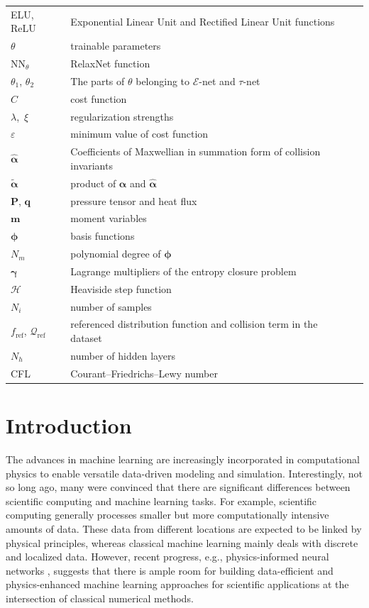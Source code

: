 \documentclass[preprint,3p,12pt,sort&compress]{elsarticle}
\begin{document}
\begin{table}
\begin{tabular*}{16cm}{lll}
		ELU, ReLU & Exponential Linear Unit and Rectified Linear Unit functions \\
		$\theta$ & trainable parameters \\
		$\mathrm{NN}_\theta$ & RelaxNet function \\
		$\theta_1$, $\theta_2$ & The parts of $\theta$ belonging to $\mathcal E$-net and $\tau$-net \\
		$C$ & cost function \\
		$\lambda$,\ $\xi$ & regularization strengths \\
		$\varepsilon$ & minimum value of cost function \\
		$\hat{\boldsymbol\alpha}$ & Coefficients of Maxwellian in summation form of collision invariants \\
		$\tilde{\boldsymbol\alpha}$ & product of ${\boldsymbol\alpha}$ and $\hat{\boldsymbol\alpha}$ \\
		$\mathbf P$, $\mathbf q$ & pressure tensor and heat flux \\
		$\mathbf m$ & moment variables \\
		$\boldsymbol\phi$ & basis functions \\
		$N_m$ & polynomial degree of $\boldsymbol\phi$ \\
		$\boldsymbol \gamma$ & Lagrange multipliers of the entropy closure problem \\
		$\mathscr H$ & Heaviside step function \\
		$N_i$ & number of samples \\
		$f_\mathrm{ref}$, $\mathcal Q_\mathrm{ref}$ & referenced distribution function and collision term in the dataset \\
		$N_h$ & number of hidden layers \\
		CFL & Courant–Friedrichs–Lewy number \\
		\hline
	\end{tabular*}
	\label{table:nomenclature}
\end{table}

\newpage

\section{Introduction}

The advances in machine learning are increasingly incorporated in computational physics to enable versatile data-driven modeling and simulation.
Interestingly, not so long ago, many were convinced that there are significant differences between scientific computing and machine learning tasks.
For example, scientific computing generally processes smaller but more computationally intensive amounts of data.
These data from different locations are expected to be linked by physical principles, whereas classical machine learning mainly deals with discrete and localized data.
However, recent progress, e.g., physics-informed neural networks \cite{raissi2019physics}, suggests that there is ample room for building data-efficient and physics-enhanced machine learning approaches for scientific applications at the intersection of classical numerical methods.
\end{document}
